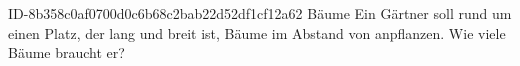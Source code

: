 \begin{exercise}
      {ID-8b358c0af0700d0c6b68c2bab22d52df1cf12a62}
      {Bäume}
  \ifproblem\problem
    Ein Gärtner soll rund um einen Platz, der  lang und 
    breit ist, Bäume im Abstand von  anpflanzen. Wie viele Bäume
    braucht er?
  \fi
\end{exercise}
